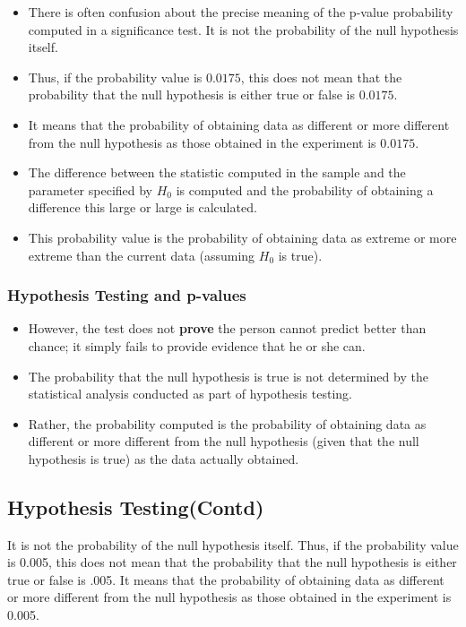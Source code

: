 \documentclass[]{report}
\begin{document}
{{{\begin{itemize}
\item There is often confusion about the precise meaning of the p-value probability computed in a significance test. It is not the probability of the null hypothesis itself.
\item Thus, if the probability value is $0.0175$, this does not mean that the probability that the null hypothesis is either true or false is $0.0175$.
\item It means that the probability of obtaining data as different or more different from the null hypothesis as those obtained in the experiment is $0.0175$.
\item 
The difference between the statistic computed in the sample and the parameter specified by $H_0$ is computed and the probability of obtaining a difference this large or large is calculated. \item This probability value is the probability of obtaining data as extreme or more extreme than the current data (assuming $H_0$ is true). 
\end{itemize}



\subsubsection{Hypothesis Testing and p-values}



\begin{itemize}
\item However, the test does not \textbf{prove} the person cannot predict better than chance; it simply fails to provide evidence that he or she can. \item The probability that the null hypothesis is true is not determined by the statistical analysis conducted as part of hypothesis testing. \item Rather, the probability computed is the probability of obtaining data as different or more different from the null hypothesis (given that the null hypothesis is true) as the data actually obtained. 
\end{itemize}



\subsection{Hypothesis Testing(Contd)}

It is not the probability of the null hypothesis itself. Thus, if the probability value is 0.005, this does not mean that the probability that the null hypothesis is either true or false is .005. It means that the probability of obtaining data as different or more different from the null hypothesis as those obtained in the experiment is 0.005.



}}}
\end{document}
